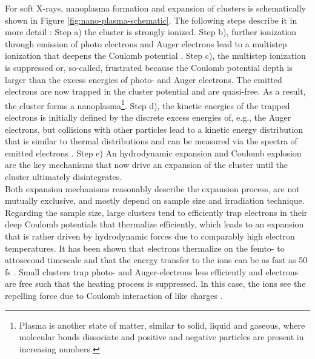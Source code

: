 %
For soft X-rays, nanoplasma formation and expansion of clusters is schematically shown in Figure \ref{fig:nano-plasma-schematic}. The following steps describe it in more detail \citep{Arbeiter-2011-NJP,Bostedt-2010-JPB}: Step a) the cluster is strongly ionized. Step b), further ionization through emission of photo electrons and Auger electrons lead to a multistep ionization that deepens the Coulomb potential \citep{Wabnitz-2002-Nature,Laarmann-2004-PRL,Bostedt-2008-PRL}. Step c), the multistep ionization is suppressed or, so-called, frustrated because the Coulomb potential depth is larger than the excess energies of photo- and Auger electrons. The emitted electrons are now trapped in the cluster potential and are quasi-free. As a result, the cluster forms a nanoplasma\footnote{Plasma is another state of matter, similar to solid, liquid and gaseous, where molecular bonds dissociate and positive and negative particles are present in increasing numbers.}. Step d), the kinetic energies of the trapped electrons is initially defined by the discrete excess energies of, e.g., the Auger electrons, but collisions with other particles lead to a kinetic energy distribution that is similar to thermal distributions and can be measured via the spectra of emitted electrons \citep{Laarmann-2005-PRL,Bostedt-2010-NJP}. Step e) An hydrodynamic expansion and Coulomb explosion are the key mechanisms that now drive an expansion of the cluster until the cluster ultimately disintegrates.\\[1\baselineskip]
%
Both expansion mechanisms reasonably describe the expansion process, are not mutually exclusive, and mostly depend on sample size and irradiation technique. Regarding the sample size, large clusters tend to efficiently trap electrons in their deep Coulomb potentials that thermalize efficiently, which leads to an expansion that is rather driven by hydrodynamic forces due to comparably high electron temperatures. It has been shown that electrons thermalize on the femto- to attosecond timescale and that the energy transfer to the ions can be as fast as 50 fs \citep{Arbeiter-2010-PRA}. Small clusters trap photo- and Auger-electrons less efficiently and electrons are free such that the heating process is suppressed. In this case, the ions see the repelling force due to Coulomb interaction of like charges \citep{Lezius-1998-PRL}.\\[1\baselineskip]
